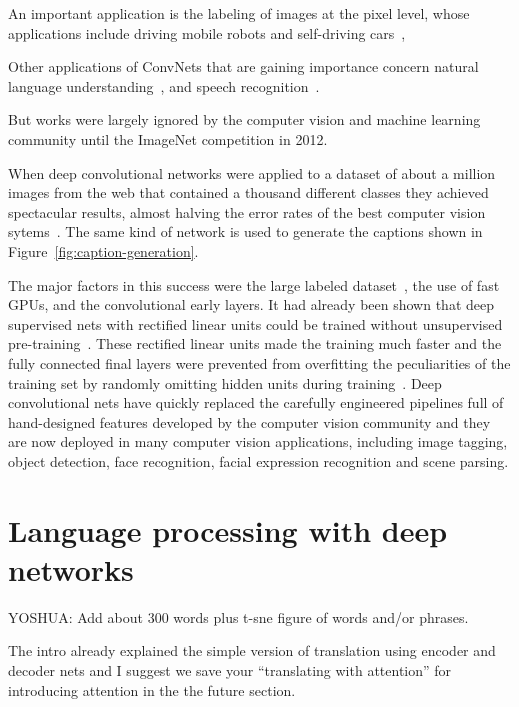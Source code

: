 \documentclass[10pts]{article}
\begin{document}
An important application is the labeling of images at the pixel level,
whose applications include driving mobile robots and self-driving
cars~\cite{hadsell-jfr-09,farabet-icml-12}, 

Other applications of ConvNets that are gaining importance concern
natural language understanding~\citep{collobert:2011b}, and speech
recognition~\cite{sainath-xx}.

But works were largely ignored by the computer vision and machine
learning community until the ImageNet competition in 2012.

When deep convolutional networks were applied to a dataset of about a
million images from the web that contained a thousand different classes
they achieved spectacular results, almost halving the error rates of the
best computer vision sytems~\citep{Krizhevsky-2012-small}.  
The same kind of network is used to generate the captions shown in Figure~\ref{fig:caption-generation}.

The major factors in this
success were the large labeled dataset~\citep{imagenet_cvpr09}, the use of fast GPUs,
and the convolutional early layers.  It had already been shown that deep
supervised nets with rectified linear units could be trained without
unsupervised pre-training~\citep{Glorot+al-AI-2011-small}. 
These rectified linear units made the
training much faster and the fully connected final layers were prevented
from overfitting the peculiarities of the training set by randomly omitting
hidden units during training~\citep{Srivastava14}. Deep convolutional nets
have quickly replaced the carefully engineered pipelines full of
hand-designed features developed by the computer vision community and they
are now deployed in many computer vision applications, including image
tagging, object detection, face recognition, facial expression recognition
and scene parsing.




\section{Language processing with deep networks}

\iffalse
YOSHUA: Add about 300 words plus t-sne figure of words and/or phrases.

The intro already explained the simple version of translation using encoder
and decoder nets and I suggest we save your ``translating with attention''
for introducing attention in the the future section.
\end{document}

